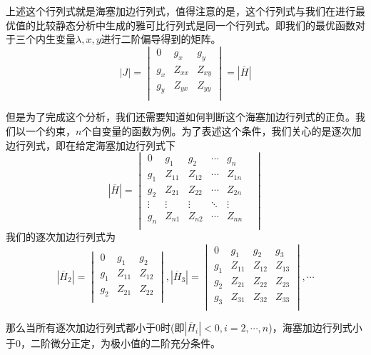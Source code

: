 \documentclass[UTF8,12pt]{ctexart}
\numberwithin{equation}{section} %
\numberwithin{figure}{section}
\numberwithin{table}{section}
\begin{document}
	上述这个行列式就是海塞加边行列式，值得注意的是，这个行列式与我们在进行最优值的比较静态分析中生成的雅可比行列式是同一个行列式。即我们的最优函数对于三个内生变量$\lambda,x,y$进行二阶偏导得到的矩阵。
	\begin{equation}
		|J|
		=
		\begin{vmatrix}
			0 & g_x & g_y \\
			g_x & Z_{xx} & Z_{xy}\\
			g_y & Z_{yx} & Z_{yy}\\
		\end{vmatrix}
		=
		|\overline{H}|
	\end{equation}
	
	但是为了完成这个分析，我们还需要知道如何判断这个海塞加边行列式的正负。我们以一个约束，$n$个自变量的函数为例。为了表述这个条件，我们关心的是逐次加边行列式，即在给定海塞加边行列式下
	\begin{equation}
		|\overline{H}| =
		\begin{vmatrix}
			0 & g_1 & g_2 & \cdots & g_n \\
			g_1 & Z_{11} & Z_{12} & \cdots & Z_{1n} \\
			g_2 & Z_{21} & Z_{22} & \cdots & Z_{2n} \\
			\vdots & \vdots & \vdots & \ddots & \vdots &\\
			g_n & Z_{n1} & Z_{n2} & \cdots & Z_{nn} \\
		\end{vmatrix}
	\end{equation}
	我们的逐次加边行列式为
	\begin{equation}
		|\overline{H}_2| = 
		\begin{vmatrix}
			0 & g_1 & g_2 \\
			g_1 & Z_{11} & Z_{12}\\
			g_2 & Z_{21} & Z_{22}\\
		\end{vmatrix},
		|\overline{H}_3| = 
		\begin{vmatrix}
			0 & g_1 & g_2 & g_3 \\
			g_1 & Z_{11} & Z_{12} & Z_{13}\\
			g_2 & Z_{21} & Z_{22} & Z_{23}\\
			g_3 & Z_{31} & Z_{32} & Z_{33}\\
		\end{vmatrix},\cdots
	\end{equation}
	
	那么当所有逐次加边行列式都小于0时(即$|\overline{H}_i| < 0,i = 2,\cdots,n$)，海塞加边行列式小于0，二阶微分正定，为极小值的二阶充分条件。
	
\end{document}
